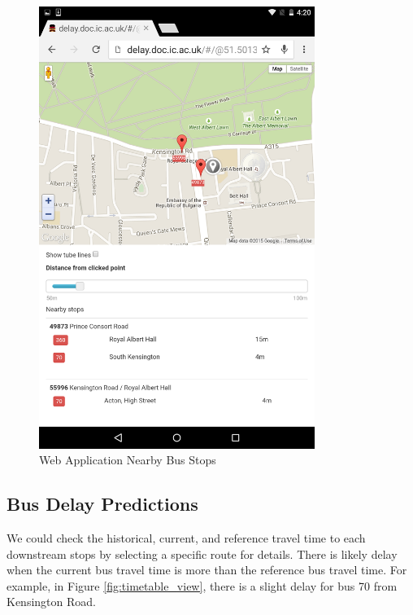 \begin{figure}
\centering
\includegraphics[width=0.8\textwidth]{figures/clicked_view.png}
\caption{\label{fig:clicked_view} Web Application Nearby Bus Stops}
\end{figure}

\subsection{Bus Delay Predictions}
\par We could check the historical, current, and reference travel time to each downstream stops by selecting a specific route for details. There is likely delay when the current bus travel time is more than the reference bus travel time. For example, in Figure \ref{fig:timetable_view}, there is a slight delay for bus 70 from Kensington Road.


